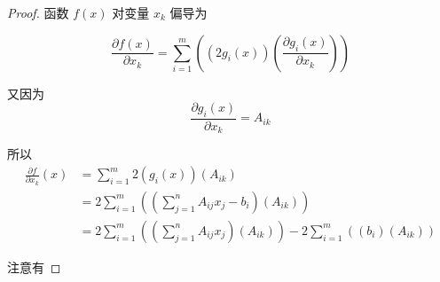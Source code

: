 \begin{proof}
    函数 $ f(x) $ 对变量 $ x_{k} $ 偏导为
    
    \begin{equation} \frac{\partial f(x)}{\partial x_{k}}=\sum_{i=1}^{m}\left(\left(2 g_{i}(x)\right)\left(\frac{\partial g_{i}(x)}{\partial x_{k}}\right)\right) \end{equation}


    又因为
    \begin{equation} \frac{\partial g_{i}(x)}{\partial x_{k}}=A_{i k} \end{equation}


    所以
    \begin{equation} \begin{aligned} 
        \frac{\partial f}{\partial x_{k}}(x) 
        &=\sum_{i=1}^{m} 2\left(g_{i}(x)\right)\left(A_{i k}\right) \\
        &=2 \sum_{i=1}^{m}\left(\left(\sum_{j=1}^{n} A_{i j} x_{j}-b_{i}\right)\left(A_{i k}\right)\right) 
        \\ &=2 \sum_{i=1}^{m}\left(\left(\sum_{j=1}^{n} A_{i j} x_{j}\right)\left(A_{i k}\right)\right)-2 \sum_{i=1}^{m}\left(\left(b_{i}\right)\left(A_{i k}\right)\right) \end{aligned} \end{equation}

    注意有
        


\end{proof}
